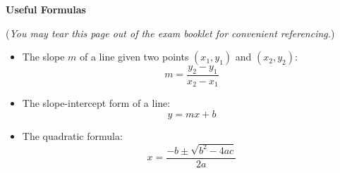\documentclass[addpoints,12pt,answers]{exam}
\begin{document}
\newpage

\begin{center}
   {\Large \textbf{Useful Formulas}}
\end{center}

(\textit{You may tear this page out of the exam booklet for convenient referencing.})

\begin{itemize}
   \item The slope $m$ of a line given two points $(x_1,y_1)$ and $(x_2,y_2)$: 
   \[m = \frac{y_2-y_1}{x_2-x_1}\]
   \item The slope-intercept form of a line:
   \[y=mx+b\]
   \item The quadratic formula:
   \[x = \frac{-b\pm\sqrt{b^2-4ac}}{2a}\]
\end{itemize}
\end{document}
